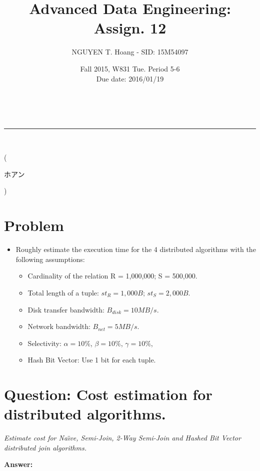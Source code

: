 \documentclass[a4paper,12pt]{article}
\makeatletter
\newcommand{\linia}{\rule{\linewidth}{0.5pt}}
\renewcommand{\maketitle} {
\begin{center}
\vspace{2ex}
{\LARGE \textsc{\@title}}
\vspace{1ex}
\\
\linia\\
\@author \hfill \@date
\vspace{4ex}
\end{center}
}
\makeatother
\begin{document}
\title{Advanced Data Engineering: Assign. 12}

\author{NGUYEN T. Hoang - SID: 15M54097}

\date{Fall 2015, W831 Tue. Period 5-6 \\ \hfill Due date: 2016/01/19}

\maketitle
\vspace{-4.5em}
\hspace{5.3em} (\begin{CJK}{UTF8}{min}ホアン\end{CJK})
\vspace{4em}
\section*{Problem}
\begin{itemize}
	\item Roughly estimate the execution time for the 4 distributed algorithms with the following assumptions:
\begin{itemize}
	\setlength{\parskip}{0cm}
	\setlength{\itemsep}{0cm}
	\item Cardinality of the relation {R} = 1,000,000; {S} = 500,000.
	\item Total length of a tuple: $st_R = 1,000B$; $st_S = 2,000B$.
	\item Disk transfer bandwidth: $B_{disk} = 10MB/s$.
	\item Network bandwidth: $B_{net} = 5MB/s$.
	\item Selectivity: $\alpha = 10 \%$, $\beta = 10 \%$, $\gamma = 10 \%$,  
	\item Hash Bit Vector: Use 1 bit for each tuple.
\end{itemize}
\end{itemize}
\section*{Question: Cost estimation for distributed algorithms.}
\setcounter{section}{1}

\textit{Estimate cost for Na\"{\i}ve, Semi-Join, 2-Way Semi-Join and Hashed Bit Vector distributed join algorithms.} 

\vspace{1.5em}
\noindent
\textbf{Answer:} 
\noindent
\end{document}
